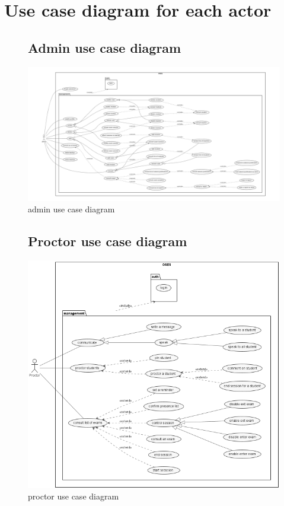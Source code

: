 \documentclass[a4paper,12p]{article}
\begin{document}
     \section{Use case diagram for each actor}


    \begin{figure}
        \subsection{Admin use case diagram}
        \centering
        \includegraphics[width=\textwidth]{admin_UCD}
        \caption{admin use case diagram}
    \end{figure}
     \clearpage

     \begin{figure}
         \subsection{Proctor use case diagram}
         \centering
         \includegraphics[width=\textwidth]{proctor_UCD}
         \caption{proctor use case diagram}
     \end{figure}
\end{document}
